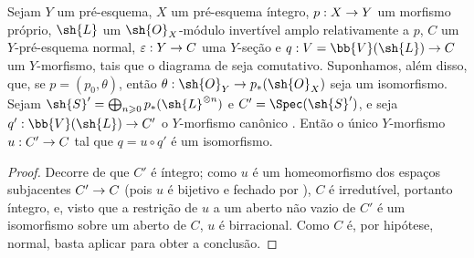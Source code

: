 \documentclass[oneside,10pt]{amsart}
\makeatletter
\renewcommand{\geq}{\geqslant}
\newcommand{\ega@arrow}[2]{\mathchoice{#1}{#2}{#2}{#2}}
\renewcommand{\to}{\ega@arrow{\longrightarrow}{\rightarrow}}
\let\EGAOriginalLabel\label
\renewcommand{\label}[1]{\phantomsection\EGAOriginalLabel{#1}}
\makeatother
\begin{document}
\begin{proposition}[8.11.7]
\label{II.8.11.7}
Sejam $Y$ um pré-esquema, $X$ um pré-esquema íntegro, $p:X\to Y$ um morfismo próprio, $\sh{L}$ um $\sh{O}_X$-módulo invertível amplo relativamente a $p$, $C$ um $Y$-pré-esquema normal, $\varepsilon:Y\to C$ uma $Y$-seção e $q:V=\bb{V}(\sh{L})\to C$ um $Y$-morfismo, tais que o diagrama de  seja comutativo.
Suponhamos, além disso, que, se $p=(p_0,\theta)$, então $\theta:\sh{O}_Y\to p_*(\sh{O}_X)$ seja um isomorfismo.
Sejam $\sh{S}'=\bigoplus_{n\geq0}p_*(\sh{L}^{\otimes n})$ e $C'=\Spec(\sh{S}')$, e seja $q':\bb{V}(\sh{L})\to C'$ o $Y$-morfismo canônico .
Então o único $Y$-morfismo $u:C'\to C$ tal que $q=u\circ q'$ é um isomorfismo.
\end{proposition}

\begin{proof}
Decorre de  que $C'$ é íntegro;
como $u$ é um homeomorfismo dos espaços subjacentes $C'\to C$ (pois $u$ é bijetivo e fechado por ), $C$ é irredutível, portanto íntegro, e, visto que a restrição de $u$ a um aberto não vazio de $C'$ é um isomorfismo sobre um aberto de $C$, $u$ é birracional.
Como $C$ é, por hipótese, normal, basta aplicar  para obter a conclusão.
\end{proof}
\end{document}
